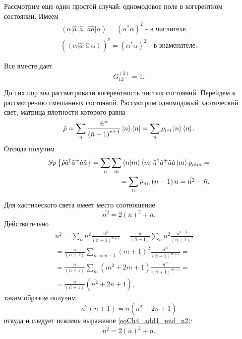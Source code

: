 Рассмотрим еще один простой случай: одномодовое поле в когерентном состоянии. Имеем
\begin{eqnarray}
\left<\alpha\right|\hat{a}^{\dag}\hat{a}^{+}\hat{a}\hat{a}\left|\alpha\right>
= \left(\alpha^{*}\alpha\right)^2
\mbox{ - в числителе},
\nonumber \\
\left(\left<\alpha\right|\hat{a}^{\dag}\hat{a}\left|\alpha\right>\right)^2
= \left(\alpha^{*}\alpha\right)^2
\mbox{ - в знаменателе}.
\nonumber
\end{eqnarray}

Все вместе дает
\[
G^{(2)}_{12} = 1.
\]

До сих пор мы рассматривали когерентность чистых состояний. Перейдем к
рассмотрению смешанных состояний. Рассмотрим одномодовый хаотический
свет, матрица плотности  которого равна 
\[
\hat{\rho} = \sum_{n}\frac{\bar{n}^n}{\left(\bar{n} + 1\right)^{n +
    1}} \ket{n}\bra{n} = 
\sum_n\rho_{nn}\ket{n}\bra{n}.
\]
Отсюда получим
\begin{eqnarray}
Sp \left\{\hat{\rho}\hat{a}^{\dag}\hat{a}^{+}\hat{a}\hat{a}\right\} = 
\sum_{n}\sum_{m}\bra{n}\ket{m}\bra{m}
\hat{a}^{\dag}\hat{a}^{+}\hat{a}\hat{a}
\ket{m} \rho_{mm} = 
\nonumber \\
= \sum_{n}\rho_{nn}\left(n - 1\right)n = \bar{n^2} - \bar{n}.
\label{eqCh4_add1_sp}
\end{eqnarray}

Для хаотического света имеет место соотношение
\begin{equation}
\bar{n^2} = 2
\left(\bar{n}\right)^2 + \bar{n}.
\label{eqCh4_add1_mid_n2}
\end{equation}
Действительно
\begin{eqnarray}
\bar{n^2} = 
\sum_n n^2 \frac{\bar{n}^n}{\left(\bar{n} + 1\right)^{n + 1}} = 
\frac{\bar{n}}{\left(\bar{n} + 1\right)}\sum_n n^2
\frac{\bar{n}^{n-1}}{\left(\bar{n} + 1\right)^{n}} =
\nonumber \\
= 
\frac{\bar{n}}{\left(\bar{n} + 1\right)}\sum_{m = n -1} \left(m +
1\right)^2
\frac{\bar{n}^m}{\left(\bar{n} + 1\right)^{m + 1}} = 
\nonumber \\
= \frac{\bar{n}}{\left(\bar{n} + 1\right)}\sum_m
\left(m^2 + 2 m + 1\right)
\frac{\bar{n}^m}{\left(\bar{n} + 1\right)^{m + 1}} = 
\nonumber \\
=
\frac{\bar{n}}{\left(\bar{n} + 1\right)}\left(\bar{n^2} + 2 \bar{n} +
1\right),
\nonumber
\end{eqnarray}
таким образом получим
\begin{equation}
\bar{n^2}\left(\bar{n} + 1\right) = 
\bar{n}\left(\bar{n^2} + 2 \bar{n} + 1\right)
\nonumber
\end{equation}
откуда и следует искомое выражение \eqref{eqCh4_add1_mid_n2}:
\begin{equation}
\bar{n^2} = 2
\left(\bar{n}\right)^2 + \bar{n}.
\nonumber
\end{equation}

